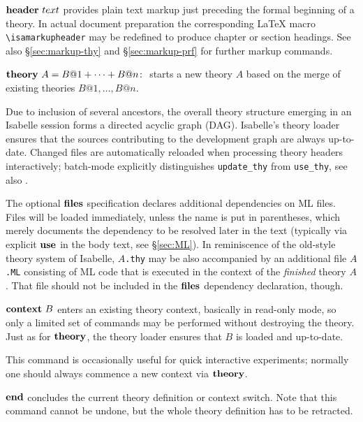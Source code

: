 \begin{descr}
\item [${\mathord{\mathbf{header}}}~text$] provides plain text markup just preceding
  the formal beginning of a theory.  In actual document preparation the
  corresponding {\LaTeX} macro \verb,\isamarkupheader, may be redefined to
  produce chapter or section headings.  See also \S\ref{sec:markup-thy} and
  \S\ref{sec:markup-prf} for further markup commands.
  
\item [${\mathord{\mathbf{theory}}}~A = B@1 + \cdots + B@n\colon$] starts a new theory $A$ based
  on the merge of existing theories $B@1, \dots, B@n$.
  
  Due to inclusion of several ancestors, the overall theory structure emerging
  in an Isabelle session forms a directed acyclic graph (DAG).  Isabelle's
  theory loader ensures that the sources contributing to the development graph
  are always up-to-date.  Changed files are automatically reloaded when
  processing theory headers interactively; batch-mode explicitly distinguishes
  \verb,update_thy, from \verb,use_thy,, see also \cite{isabelle-ref}.
  
  The optional ${\mathord{\mathbf{files}}}$ specification declares additional
  dependencies on ML files.  Files will be loaded immediately, unless the name
  is put in parentheses, which merely documents the dependency to be resolved
  later in the text (typically via explicit ${\mathord{\mathbf{use}}}$ in the body text,
  see \S\ref{sec:ML}).  In reminiscence of the old-style theory system of
  Isabelle, \texttt{$A$.thy} may be also accompanied by an additional file
  \texttt{$A$.ML} consisting of ML code that is executed in the context of the
  \emph{finished} theory $A$.  That file should not be included in the
  ${\mathord{\mathbf{files}}}$ dependency declaration, though.
  
\item [${\mathord{\mathbf{context}}}~B$] enters an existing theory context, basically in read-only
  mode, so only a limited set of commands may be performed without destroying
  the theory.  Just as for ${\mathord{\mathbf{theory}}}$, the theory loader ensures that $B$ is
  loaded and up-to-date.
  
  This command is occasionally useful for quick interactive experiments;
  normally one should always commence a new context via ${\mathord{\mathbf{theory}}}$.
  
\item [${\mathord{\mathbf{end}}}$] concludes the current theory definition or context switch.
  Note that this command cannot be undone, but the whole theory definition has
  to be retracted.

\end{descr}


